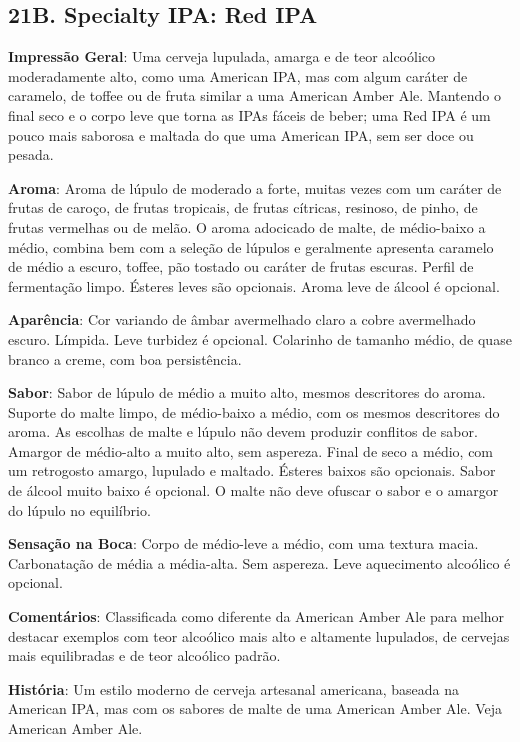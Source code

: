 \subsection*{21B. Specialty IPA: Red IPA}
\textbf{Impressão Geral}: Uma cerveja lupulada, amarga e de teor alcoólico moderadamente alto, como uma American IPA, mas com algum caráter de caramelo, de toffee ou de fruta similar a uma American Amber Ale. Mantendo o final seco e o corpo leve que torna as IPAs fáceis de beber; uma Red IPA é um pouco mais saborosa e maltada do que uma American IPA, sem ser doce ou pesada.

\textbf{Aroma}: Aroma de lúpulo de moderado a forte, muitas vezes com um caráter de frutas de caroço, de frutas tropicais, de frutas cítricas, resinoso, de pinho, de frutas vermelhas ou de melão. O aroma adocicado de malte, de médio-baixo a médio, combina bem com a seleção de lúpulos e geralmente apresenta caramelo de médio a escuro, toffee, pão tostado ou caráter de frutas escuras. Perfil de fermentação limpo. Ésteres leves são opcionais. Aroma leve de álcool é opcional.

\textbf{Aparência}: Cor variando de âmbar avermelhado claro a cobre avermelhado escuro. Límpida. Leve turbidez é opcional. Colarinho de tamanho médio, de quase branco a creme, com boa persistência.

\textbf{Sabor}: Sabor de lúpulo de médio a muito alto, mesmos descritores do aroma. Suporte do malte limpo, de médio-baixo a médio, com os mesmos descritores do aroma. As escolhas de malte e lúpulo não devem produzir conflitos de sabor. Amargor de médio-alto a muito alto, sem aspereza. Final de seco a médio, com um retrogosto amargo, lupulado e maltado. Ésteres baixos são opcionais. Sabor de álcool muito baixo é opcional. O malte não deve ofuscar o sabor e o amargor do lúpulo no equilíbrio.

\textbf{Sensação na Boca}: Corpo de médio-leve a médio, com uma textura macia. Carbonatação de média a média-alta. Sem aspereza. Leve aquecimento alcoólico é opcional.

\textbf{Comentários}: Classificada como diferente da American Amber Ale para melhor destacar exemplos com teor alcoólico mais alto e altamente lupulados, de cervejas mais equilibradas e de teor alcoólico padrão.

\textbf{História}: Um estilo moderno de cerveja artesanal americana, baseada na American IPA, mas com os sabores de malte de uma American Amber Ale. Veja American Amber Ale.

